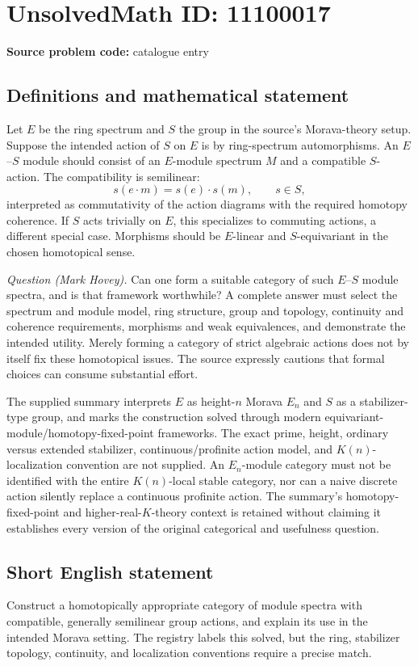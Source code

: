 \documentclass[11pt]{article}
\begin{document}
\section*{UnsolvedMath ID: 11100017}
\textbf{Source problem code:} catalogue entry
\subsection{Definitions and mathematical statement}
Let \(E\) be the ring spectrum and \(S\) the group in the source's Morava-theory setup. Suppose the intended action of \(S\) on \(E\) is by ring-spectrum automorphisms. An \(E\)--\(S\) module should consist of an \(E\)-module spectrum \(M\) and a compatible \(S\)-action. The compatibility is semilinear:
\[
 s(e\cdot m)=s(e)\cdot s(m),\qquad s\in S,
\]
interpreted as commutativity of the action diagrams with the required homotopy coherence. If \(S\) acts trivially on \(E\), this specializes to commuting actions, a different special case. Morphisms should be \(E\)-linear and \(S\)-equivariant in the chosen homotopical sense.

\emph{Question (Mark Hovey).} Can one form a suitable category of such \(E\)--\(S\) module spectra, and is that framework worthwhile? A complete answer must select the spectrum and module model, ring structure, group and topology, continuity and coherence requirements, morphisms and weak equivalences, and demonstrate the intended utility. Merely forming a category of strict algebraic actions does not by itself fix these homotopical issues. The source expressly cautions that formal choices can consume substantial effort.

The supplied summary interprets \(E\) as height-\(n\) Morava \(E_n\) and \(S\) as a stabilizer-type group, and marks the construction solved through modern equivariant-module/homotopy-fixed-point frameworks. The exact prime, height, ordinary versus extended stabilizer, continuous/profinite action model, and \(K(n)\)-localization convention are not supplied. An \(E_n\)-module category must not be identified with the entire \(K(n)\)-local stable category, nor can a naive discrete action silently replace a continuous profinite action. The summary's homotopy-fixed-point and higher-real-\(K\)-theory context is retained without claiming it establishes every version of the original categorical and usefulness question.
\subsection{Short English statement}
Construct a homotopically appropriate category of module spectra with compatible, generally semilinear group actions, and explain its use in the intended Morava setting. The registry labels this solved, but the ring, stabilizer topology, continuity, and localization conventions require a precise match.
\end{document}
